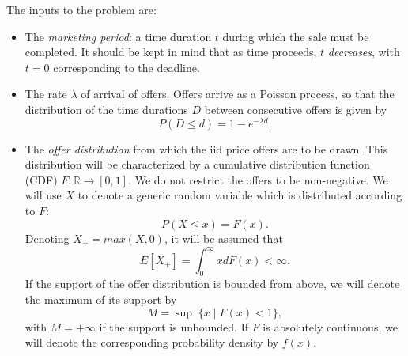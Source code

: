 \documentclass{article}
\numberwithin{equation}{section}
\newcommand{\Real}{\mathbb{R}}
\begin{document}
The inputs to the problem are:

\begin{itemize}
	
	\item The {\it{marketing period}}: a time duration $t$ 
	during which the sale must be completed.
	It should be kept in mind that 
	as time proceeds, $t$ {\it{decreases}}, with $t=0$ corresponding to the deadline.
	
	\item The rate $\lambda$ of arrival of offers. Offers arrive as a Poisson process, so that 
	the distribution of the time durations $D$ between 
	consecutive offers is given by
	\begin{equation}\label{pp}P(D\leq d)=1-e^{-\lambda d}.
	\end{equation}
	
	\item The {\it{offer distribution}}  from which 
	the iid price offers are to be drawn. This distribution will 
	be characterized by a cumulative distribution function (CDF) $F:\Real\rightarrow [0,1]$. We do not restrict the offers to be non-negative. We will use $X$ to denote a generic random variable which
	is distributed according to $F$:
	\begin{equation}\label{xx}P(X\leq x)=F(x).\end{equation}
	Denoting $X_+=max(X,0)$, it will be assumed that 
	\begin{equation}\label{fm}
		E[X_+]=\int_{0}^\infty xdF(x)<\infty.\end{equation}
	If the support of the offer distribution is bounded from above, we will denote the maximum of its support by
	\begin{equation}\label{def_M}M=\sup\; \{ x\;|\; F(x)<1\},\end{equation}
	with $M=+\infty$ if the support is unbounded.
	If $F$ is absolutely continuous, we will denote 
	the corresponding probability density by $f(x)$.
	

\end{itemize}
\end{document}
